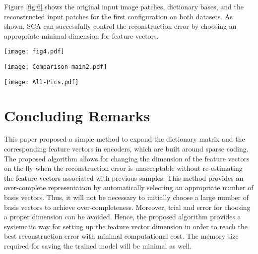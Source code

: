 \documentclass[journal]{IEEEtran}
\begin{document}
Figure \ref{fig:6} shows the original input image patches, dictionary bases, and the reconstructed input patches for the first configuration on both datasets. As shown, SCA can successfully control the reconstruction error by choosing an appropriate minimal dimension for feature vectors. 

\begin{figure*}[]
\centering
\texttt{[image: fig4.pdf]}
\caption{For the three studied configurations, the first row depicts evolution of T-MSE as more inputs are presented to the sparse coding automata algorithm. The second row shows the visited states and the applied corresponding actions. The third row demonstrates the evolution of feature vector dimension.}
\label{fig:4}
\end{figure*}

\begin{figure*}[]
\centering
\texttt{[image: Comparison-main2.pdf]}
\caption{The first row shows the results of the SCA and sparse coding with two configurations on Caltech dataset. The second row provides the same information on CIFAR-10 dataset.}
\label{fig:5}
\end{figure*}

\begin{figure*}[]
\centering
\texttt{[image: All-Pics.pdf]}
\caption{Reconstructed image patches (left), bases of the learned dictionary (middle), and the original input image patches (right).}
\label{fig:6}
\end{figure*}

\section{Concluding Remarks} 
\label{conclude}

This paper proposed a simple method to expand the dictionary matrix and the corresponding feature vectors in encoders, which are built around sparse coding. The proposed algorithm allows for changing the dimension of the feature vectors on the fly when the reconstruction error is unacceptable without re-estimating the feature vectors associated with previous samples. This method provides an over-complete representation by automatically selecting an appropriate number of basis vectors. Thus, it will not be necessary to initially choose a large number of basis vectors to achieve over-completeness. Moreover, trial and error for choosing a proper dimension can be avoided. Hence, the proposed algorithm provides a systematic way for setting up the feature vector dimension in order to reach the best reconstruction error with minimal computational cost. The memory size required for saving the trained model will be minimal as well.



\end{document}
